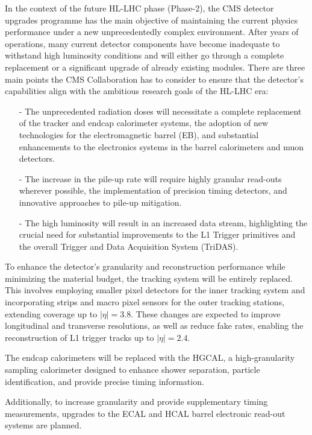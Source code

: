 In the context of the future HL-LHC phase (Phase-2), the CMS detector upgrades programme has the main objective of maintaining the current physics performance under a new unprecedentedly complex environment. 
After years of operations, many current detector components have become inadequate to withstand high luminosity conditions and will either go through a complete replacement or a significant upgrade of already existing modules. There are three main points the CMS Collaboration has to consider to ensure that the detector's capabilities align with the ambitious research goals of the HL-LHC era:
\begin{itemize}
    \item [-] The unprecedented radiation doses will necessitate a complete replacement of the tracker and endcap calorimeter systems, the adoption of new technologies for the electromagnetic barrel (EB), and substantial enhancements to the electronics systems in the barrel calorimeters and muon detectors.
    \item [-] The increase in the pile-up rate will require highly granular read-outs wherever possible, the implementation of precision timing detectors, and innovative approaches to pile-up mitigation.
    \item [-] The high luminosity will result in an increased data stream, highlighting the crucial need for substantial improvements to the L1 Trigger primitives and the overall Trigger and Data Acquisition System (TriDAS).
\end{itemize}

To enhance the detector's granularity and reconstruction performance while minimizing the material budget, the tracking system will be entirely replaced. This involves employing smaller pixel detectors for the inner tracking system and incorporating strips and macro pixel sensors for the outer tracking stations, extending coverage up to $|\eta|=3.8$. These changes are expected to improve longitudinal and transverse resolutions, as well as reduce fake rates, enabling the reconstruction of L1 trigger tracks up to $|\eta|=2.4$.

The endcap calorimeters will be replaced with the HGCAL, a high-granularity sampling calorimeter designed to enhance shower separation, particle identification, and provide precise timing information.

Additionally, to increase granularity and provide supplementary timing measurements, upgrades to the ECAL and HCAL barrel electronic read-out systems are planned. 

